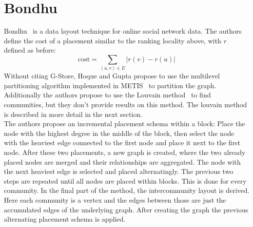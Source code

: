 \section{Bondhu}
    Bondhu~\autocite{hoque2012disk} is a data layout technique for online social network data. 
    The authors define the cost of a placement similar to the ranking locality above, with $r$ defined as before: \[ \text{cost} = \sum_{(u, v) \in E} |r(v) - r(u)| \]   
    Without citing G-Store, Hoque and Gupta propose to use the multilevel partitioning algorithm implemented in METIS~\autocite{karypis} to partition the graph. Additionally the authors propose to use the Louvain method~\autocite{blondel2008fast} to find communities, but they don't provide results on this method. The louvain method is described in more detail in the next section. \\
    The authors propose an incremental placement schema within a block:
    Place the node with the highest degree in the middle of the block, then select the node with the heaviest edge connected to the first node and place it next to the first node. 
    After these two placements, a new graph is created, where the two already placed nodes are merged and their relationships are aggregated. 
    The node with the next heaviest edge is selected and placed alternatingly. The previous two steps are repeated until all nodes are placed within blocks.
    This is done for every community.
    In the final part of the method, the intercommunity layout is derived. 
    Here each community is a vertex and the edges between those are just the accumulated edges of the underlying graph. 
    After creating the graph the previous alternating placement schema is applied.
